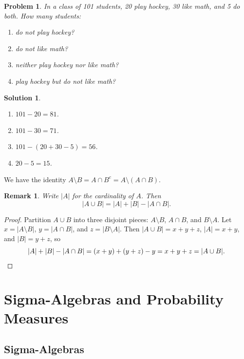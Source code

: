 \documentclass{article}
\newtheorem{problem}{Problem}
\newtheorem{solution}{Solution}
\newtheorem{remark}{Remark}
\begin{document}
\begin{problem}
In a class of 101 students, 20 play hockey, 30 like math, and 5 do both. How many students:
\begin{enumerate}
    \item do not play hockey?
    \item do not like math?
    \item neither play hockey nor like math?
    \item play hockey but do not like math?
\end{enumerate}
\end{problem}

\begin{solution}
\begin{enumerate}
    \item $101 - 20 = 81$.
    \item $101 - 30 = 71$.
    \item $101 - (20 + 30 - 5) = 56$.
    \item $20 - 5 = 15$.
\end{enumerate}
\end{solution}

We have the identity $A \setminus B = A \cap B^c = A \setminus (A \cap B)$.

\begin{remark}
Write $|A|$ for the cardinality of $A$. Then
\[
|A \cup B| = |A| + |B| - |A \cap B|.
\]
\end{remark}

\begin{proof}
Partition $A \cup B$ into three disjoint pieces: $A \setminus B$, $A \cap B$, and $B \setminus A$. Let $x = |A \setminus B|$, $y = |A \cap B|$, and $z = |B \setminus A|$. Then $|A \cup B| = x + y + z$, $|A| = x + y$, and $|B| = y + z$, so
\[
|A| + |B| - |A \cap B| = (x + y) + (y + z) - y = x + y + z = |A \cup B|. \qedhere
\]
\end{proof}

\section{Sigma-Algebras and Probability Measures}

\subsection{Sigma-Algebras}
\end{document}
